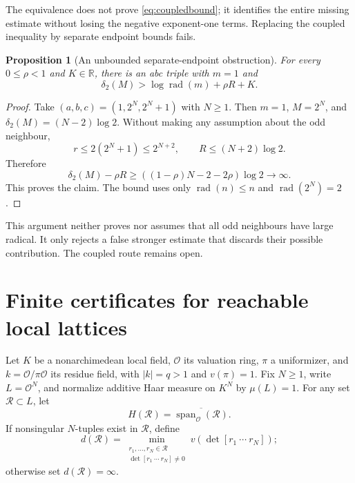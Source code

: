 \documentclass[11pt]{amsart}
\newtheorem{proposition}[theorem]{Proposition}
\theoremstyle{definition}
\theoremstyle{remark}
\newcommand{\R}{\mathbb R}
\newcommand{\OO}{\mathcal O}
\newcommand{\rad}{\operatorname{rad}}
\newcommand{\Span}{\operatorname{span}}
\begin{document}
The equivalence does not prove \eqref{eq:coupledbound}; it identifies the
entire missing estimate without losing the negative exponent-one terms.
Replacing the coupled inequality by separate endpoint bounds fails.

\begin{proposition}[An unbounded separate-endpoint obstruction]\label{prop:dyadic}
For every $0\le\rho<1$ and $K\in\R$, there is an abc triple with $m=1$ and
\[
 \delta_2(M)>\log\rad(m)+\rho R+K.
\]
\end{proposition}
\begin{proof}
Take $(a,b,c)=(1,2^N,2^N+1)$ with $N\ge1$.
Then $m=1$, $M=2^N$, and $\delta_2(M)=(N-2)\log2$.
Without making any assumption about the odd neighbour,
\[
 r\le2(2^N+1)\le2^{N+2},\qquad R\le(N+2)\log2.
\]
Therefore
\[
 \delta_2(M)-\rho R\ge
 ((1-\rho)N-2-2\rho)\log2\longrightarrow\infty.
\]
This proves the claim. The bound uses only $\rad(n)\le n$ and
$\rad(2^N)=2$.
\end{proof}

This argument neither proves nor assumes that all odd neighbours have large
radical. It only rejects a false stronger estimate that discards their
possible contribution. The coupled route remains open.

\section{Finite certificates for reachable local lattices}\label{sec:lattice}

Let $K$ be a nonarchimedean local field, $\OO$ its valuation ring,
$\pi$ a uniformizer, and $k=\OO/\pi\OO$ its residue field, with
$|k|=q>1$ and $v(\pi)=1$. Fix $N\ge1$, write $L=\OO^N$, and normalize
additive Haar measure on $K^N$ by $\mu(L)=1$.
For any set $\mathcal R\subset L$, let
\[
 H(\mathcal R)=\overline{\Span_{\OO}(\mathcal R)}.
\]
If nonsingular $N$-tuples exist in $\mathcal R$, define
\[
 d(\mathcal R)=\min_{\substack{r_1,\ldots,r_N\in\mathcal R\\
                         \det[r_1\ \cdots\ r_N]\ne0}}
                         v(\det[r_1\ \cdots\ r_N]);
\]
otherwise set $d(\mathcal R)=\infty$.
\end{document}

